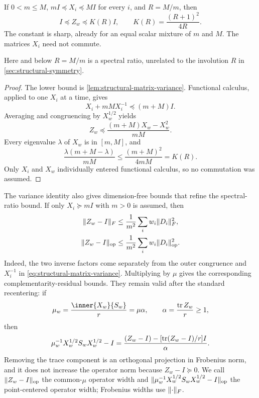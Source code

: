 \begin{theorem}
\label{thm:structural-sdp-kantorovich}
If $0<m\leq M$, $mI\preceq X_i\preceq MI$ for every $i$, and $R=M/m$,
then
\begin{equation}
 \boxed{I\preceq Z_w\preceq K(R)I,\qquad
 K(R)=\frac{(R+1)^2}{4R}.}                                \label{eq:structural-sdp-sandwich}
\end{equation}
The constant is sharp, already for an equal scalar mixture of $m$ and $M$.
The matrices $X_i$ need not commute.
\end{theorem}

Here and below $R=M/m$ is a spectral ratio, unrelated to the involution $R$
in \cref{sec:structural-symmetry}.

\begin{proof}
The lower bound is \cref{lem:structural-matrix-variance}.  Functional
calculus, applied to one $X_i$ at a time, gives
\begin{equation}
 X_i+mM X_i^{-1}\preceq(m+M)I.
\end{equation}
Averaging and congruencing by $X_w^{1/2}$ yields
\[
 Z_w\preceq\frac{(m+M)X_w-X_w^2}{mM}.
\]
Every eigenvalue $\lambda$ of $X_w$ is in $[m,M]$, and
\[
 \frac{\lambda(m+M-\lambda)}{mM}
 \leq\frac{(m+M)^2}{4mM}=K(R).
\]
Only $X_i$ and $X_w$ individually entered functional calculus, so no
commutation was assumed.
\end{proof}

The variance identity also gives dimension-free bounds that refine the
spectral-ratio bound.  If only $X_i\succeq mI$ with $m>0$ is assumed, then
\begin{align}
 \lVert Z_w-I\rVert_F
 &\leq\frac1{m^2}\sum_iw_i\lVert D_i\rVert_F^2,                 \label{eq:structural-sdp-variance-frobenius}\\
 \lVert Z_w-I\rVert_{\mathrm{op}}
 &\leq\frac1{m^2}\sum_iw_i\lVert D_i\rVert_{\mathrm{op}}^2.   \label{eq:structural-sdp-variance-operator}
\end{align}
Indeed, the two inverse factors come separately from the outer congruence
and $X_i^{-1}$ in \eqref{eq:structural-matrix-variance}.  Multiplying by
$\mu$ gives the corresponding complementarity-residual bounds.  They remain
valid after the standard recentering: if
\begin{equation}
 \mu_w=\frac{\inner{X_w}{S_w}}r=\mu\alpha,\qquad
 \alpha=\frac{\tr Z_w}{r}\geq1,
\end{equation}
then
\[
 \mu_w^{-1}X_w^{1/2}S_wX_w^{1/2}-I
 =\frac{(Z_w-I)-[\operatorname{tr}(Z_w-I)/r]I}{\alpha}.
\]
Removing the trace component is an orthogonal projection in Frobenius norm,
and it does not increase the operator norm because $Z_w-I\succeq0$.
We call $\lVert Z_w-I\rVert_{\mathrm{op}}$ the common-$\mu$ operator width and
$\lVert\mu_w^{-1}X_w^{1/2}S_wX_w^{1/2}-I\rVert_{\mathrm{op}}$ the point-centered
operator width; Frobenius widths use $\lVert\cdot\rVert_F$.

